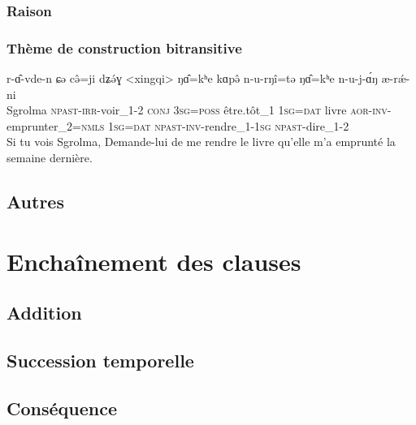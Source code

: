 \documentclass[11pt, a4paper]{book}              %
\newcommand{\ipa}[1]{{\phon \mbox{#1}}} %
\begin{document}
\subsection{Raison}

\subsection{Thème de construction bitransitive}


\begin{exe}
\ex \begin{xlist}

\ex 
\gll \ipa{dʐomɑ́} \ipa{r-ɑ̂-vde-n} \ipa{ɕə} \ipa{cə̂=ji} \ipa{dʑə́ɣ} \ipa{<xingqi>} \ipa{ŋɑ̂=kʰe} \ipa{kɑpə̂} \ipa{n-u-rŋî=tə} \ipa{ŋɑ̂=kʰe} \ipa{n-u-j-ɑ́ŋ} \ipa{æ-rǽ-ni}  \\
Sgrolma \textsc{npast-irr-}voir_1-\textsc{2} \textsc{conj} \textsc{3sg=poss} être.tôt_1 \textsc{1sg=dat} livre \textsc{aor-inv-}emprunter_2=\textsc{nmls} \textsc{1sg=dat} \textsc{npast-inv-}rendre_1-\textsc{1sg} \textsc{npast-}dire_1-2\\
Si tu vois Sgrolma, Demande-lui de me rendre le livre qu'elle m'a emprunté la semaine dernière.\\


\end{xlist}
\end{exe}



\section{Autres}

\chapter{Enchaînement des clauses}

\section{Addition}

\section{Succession temporelle}

\section{Conséquence}
\end{document}
